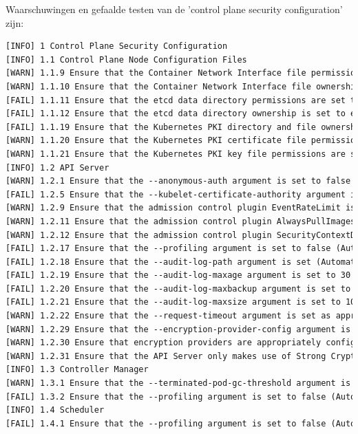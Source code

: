 Waarschuwingen en gefaalde testen van de 'control plane security configuration' zijn:
\begin{lstlisting}[language=tex, caption={Warnings en fails kube-bench control plane}]
[INFO] 1 Control Plane Security Configuration
[INFO] 1.1 Control Plane Node Configuration Files
[WARN] 1.1.9 Ensure that the Container Network Interface file permissions are set to 600 or more restrictive (Manual)
[WARN] 1.1.10 Ensure that the Container Network Interface file ownership is set to root:root (Manual)
[FAIL] 1.1.11 Ensure that the etcd data directory permissions are set to 700 or more restrictive (Automated)
[FAIL] 1.1.12 Ensure that the etcd data directory ownership is set to etcd:etcd (Automated)
[FAIL] 1.1.19 Ensure that the Kubernetes PKI directory and file ownership is set to root:root (Automated)
[WARN] 1.1.20 Ensure that the Kubernetes PKI certificate file permissions are set to 600 or more restrictive (Manual)
[WARN] 1.1.21 Ensure that the Kubernetes PKI key file permissions are set to 600 (Manual)
[INFO] 1.2 API Server
[WARN] 1.2.1 Ensure that the --anonymous-auth argument is set to false (Manual)
[FAIL] 1.2.5 Ensure that the --kubelet-certificate-authority argument is set as appropriate (Automated)
[WARN] 1.2.9 Ensure that the admission control plugin EventRateLimit is set (Manual)
[WARN] 1.2.11 Ensure that the admission control plugin AlwaysPullImages is set (Manual)
[WARN] 1.2.12 Ensure that the admission control plugin SecurityContextDeny is set if PodSecurityPolicy is not used (Manual)
[FAIL] 1.2.17 Ensure that the --profiling argument is set to false (Automated)
[FAIL] 1.2.18 Ensure that the --audit-log-path argument is set (Automated)
[FAIL] 1.2.19 Ensure that the --audit-log-maxage argument is set to 30 or as appropriate (Automated)
[FAIL] 1.2.20 Ensure that the --audit-log-maxbackup argument is set to 10 or as appropriate (Automated)
[FAIL] 1.2.21 Ensure that the --audit-log-maxsize argument is set to 100 or as appropriate (Automated)
[WARN] 1.2.22 Ensure that the --request-timeout argument is set as appropriate (Manual)
[WARN] 1.2.29 Ensure that the --encryption-provider-config argument is set as appropriate (Manual)
[WARN] 1.2.30 Ensure that encryption providers are appropriately configured (Manual)
[WARN] 1.2.31 Ensure that the API Server only makes use of Strong Cryptographic Ciphers (Manual)
[INFO] 1.3 Controller Manager
[WARN] 1.3.1 Ensure that the --terminated-pod-gc-threshold argument is set as appropriate (Manual)
[FAIL] 1.3.2 Ensure that the --profiling argument is set to false (Automated)
[INFO] 1.4 Scheduler
[FAIL] 1.4.1 Ensure that the --profiling argument is set to false (Automated)
\end{lstlisting}

